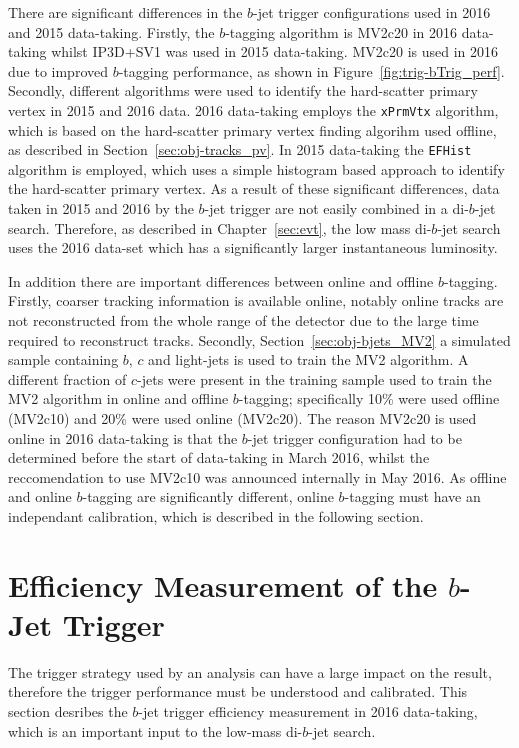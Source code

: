 There are significant differences in the  $b$-jet trigger configurations used in 2016 and 2015 data-taking.
Firstly, the $b$-tagging algorithm is MV2c20 in 2016 data-taking whilst IP3D+SV1 was used in 2015 data-taking.
MV2c20 is used in 2016 due to improved $b$-tagging performance, as shown in Figure~\ref{fig:trig-bTrig_perf}.
Secondly, different algorithms were used to identify the hard-scatter primary vertex in 2015 and 2016 data.
2016 data-taking employs the \verb|xPrmVtx| algorithm, which is based on the hard-scatter primary vertex finding algorihm used offline, as described in Section~\ref{sec:obj-tracks_pv}.
In 2015 data-taking the \verb|EFHist| algorithm is employed, which uses a simple histogram based approach to identify the hard-scatter primary vertex.
As a result of these significant differences, data taken in 2015 and 2016 by the $b$-jet trigger are not easily combined in a di-$b$-jet search.
Therefore, as described in Chapter~\ref{sec:evt}, the low mass di-$b$-jet search uses the 2016 data-set which has a significantly larger instantaneous luminosity.

In addition there are important differences between online and offline $b$-tagging.
Firstly, coarser tracking information is available online, notably online tracks are not reconstructed from the whole range of the detector due to the large time required to reconstruct tracks.
Secondly, Section~\ref{sec:obj-bjets_MV2} a simulated sample containing $b$, $c$ and light-jets is used to train the MV2 algorithm.
A different fraction of $c$-jets were present in the training sample used to train the MV2 algorithm in online and offline $b$-tagging;
specifically 10\% were used offline (MV2c10) and 20\% were used online (MV2c20).
The reason MV2c20 is used online in 2016 data-taking is that the $b$-jet trigger configuration
had to be determined before the start of data-taking in March 2016,
whilst the reccomendation to use MV2c10 was announced internally in May 2016.
As offline and online $b$-tagging are significantly different, online $b$-tagging must have an independant calibration, which is described in the following section.

\newpage
\section{Efficiency Measurement of the $b$-Jet Trigger}
\label{sec:trig-bjet_eff}

The trigger strategy used by an analysis can have a large impact on the result,
therefore the trigger performance must be understood and calibrated.
This section desribes the \mbox{$b$-jet} trigger efficiency measurement in 2016 data-taking,
which is an important input to the low-mass di-$b$-jet search.

